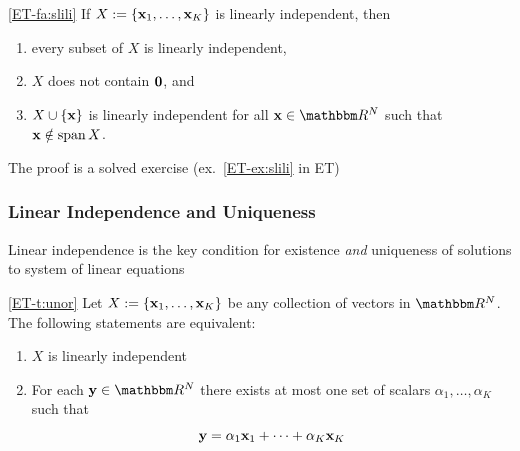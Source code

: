 \begin{frame}

    \vspace{2em}
    \Fact\eqref{ET-fa:slili}
        If $X := \{{\mathbf x}_1,\ldots, {\mathbf x}_K\}$ is linearly independent, then
        \begin{enumerate}
            \item every subset of $X$ is linearly independent, 
            \item $X$ does not contain ${\mathbf 0}$, and
            \item $X \cup \{ {\mathbf x} \}$ is linearly independent for all $\boldx
                \in \RR^N$ such that ${\mathbf x} \notin \operatorname{span} X$.
        \end{enumerate}
   
    The proof is a solved exercise (ex.~\ref{ET-ex:slili} in ET)
\end{frame}

\begin{frame}\frametitle{Linear Independence and Uniqueness}
    
    \vspace{2em}
    Linear independence is the key condition for existence \emph{and} 
    uniqueness of solutions to system of linear equations 
    
    \vspace{.7em}
    \Thm\eqref{ET-t:unor}
    Let $X := \{{\mathbf x}_1,\ldots,{\mathbf x}_K\}$ be any collection of vectors in
    $\RR^N$.  The following statements are equivalent:
    \begin{enumerate}
        \item $X$ is linearly independent  
        \item For each $\boldy \in \RR^N$
            there exists at most one set of scalars $\alpha_1,\ldots,\alpha_K$
            such that 
            \begin{equation}
                \label{eq:yilcx}
                {\mathbf y} =  
                \alpha_1 {\mathbf x}_1
                + \cdots +
                \alpha_K {\mathbf x}_K
            \end{equation}
    \end{enumerate}
\end{frame}

